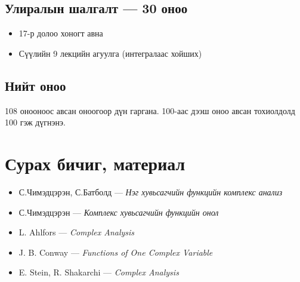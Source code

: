 \subsection*{Улиралын шалгалт — 30 оноо}
\begin{itemize}
\item 17-р долоо хоногт авна
\item Сүүлийн 9 лекцийн агуулга (интегралаас хойших)
\end{itemize}

\subsection*{Нийт оноо}
108 онооноос авсан оноогоор дүн гаргана.  
100-аас дээш оноо авсан тохиолдолд 100 гэж дүгнэнэ.


\section*{Сурах бичиг, материал}

\begin{itemize}
\item С.Чимэдцэрэн, С.Батболд — \emph{Нэг хувьсагчийн функцийн комплекс анализ}
\item С.Чимэдцэрэн — \emph{Комплекс хувьсагчийн функцийн онол}
\item L. Ahlfors — \emph{Complex Analysis}
\item J. B. Conway — \emph{Functions of One Complex Variable}
\item E. Stein, R. Shakarchi — \emph{Complex Analysis}
\end{itemize}

